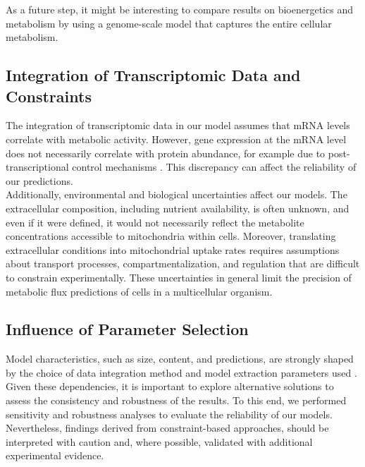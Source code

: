 As a future step, it might be interesting to compare results on bioenergetics and metabolism by using a genome-scale model that captures the entire cellular metabolism.

\subsection{Integration of Transcriptomic Data and Constraints}
The integration of transcriptomic data in our model assumes that mRNA levels correlate with metabolic activity. However, gene expression at the mRNA level does not necessarily correlate with protein abundance, for example due to post-transcriptional control mechanisms \citep{liuDependencyCellularProtein2016}.
This discrepancy can affect the reliability of our predictions. 
\\

Additionally, environmental and biological uncertainties affect our models. The extracellular composition, including nutrient availability, is often unknown, and even if it were defined, it would not necessarily reflect the metabolite concentrations accessible to mitochondria within cells. Moreover, translating extracellular conditions into mitochondrial uptake rates requires assumptions about transport processes, compartmentalization, and regulation that are difficult to constrain experimentally. These uncertainties in general limit the precision of metabolic flux predictions of cells in a multicellular organism. 
\\

\subsection{Influence of Parameter Selection}
Model characteristics, such as size, content, and predictions, are strongly shaped by the choice of data integration method and model extraction parameters used \citep{opdamSystematicEvaluationMethods2017}.
Given these dependencies, it is important to explore alternative solutions to assess the consistency and robustness of the results. To this end, we performed sensitivity and robustness analyses to evaluate the reliability of our models. Nevertheless, findings derived from constraint-based approaches, should be interpreted with caution and, where possible, validated with additional experimental evidence. 

